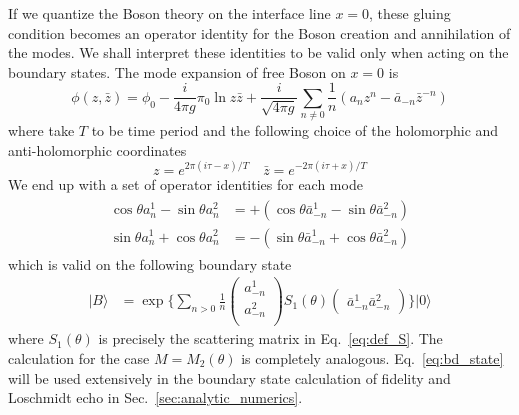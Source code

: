 If we quantize the Boson theory on the interface line $x = 0$, these gluing condition becomes an operator identity for the Boson creation and annihilation of the modes. We shall interpret these identities to be valid only when acting on the boundary states. The mode expansion of free Boson on $x = 0$\cite{di_francesco_conformal_1997} is
\begin{equation}
\phi(z, \bar{z} ) = \phi_0 - \frac{i}{4\pi g } \pi_0 \ln z \bar{z}  + \frac{i}{\sqrt{4\pi g} } \sum_{n \ne 0 } \frac{1}{n} \left(a_n z^n - \bar{a}_{-n } \bar{z}^{-n}   \right)
\end{equation}
where take $T$ to be time period and the following choice of the holomorphic and anti-holomorphic coordinates
\begin{equation}
z= e^{ 2\pi ( i\tau - x ) / T } \quad \bar{z} = e^{ -2\pi ( i\tau + x ) / T }
\end{equation}
We end up with a set of operator identities for each mode
\begin{eqnarray}\begin{aligned}
\label{eq:rotation_a_basis}
\cos\theta a_n^1-\sin\theta a_n^2 &= +( \cos\theta\bar{a}_{-n}^1-\sin\theta \bar{a}_{-n}^2 ) \\
\sin\theta a_n^1+\cos\theta a_n^2 &= -( \sin\theta\bar{a}_{-n}^1+\cos\theta \bar{a}_{-n}^2 ) 
\end{aligned}\end{eqnarray}
which is valid on the following boundary state
\begin{equation}
\label{eq:bd_state}
\begin{aligned}
| B \rangle 
& =  \exp\Big\{ \sum_{n > 0 } \frac{1}{n}
\begin{pmatrix}
a_{-n}^1\\
a_{-n}^2\\                              
\end{pmatrix}
S_1( \theta )
\begin{pmatrix}
\bar{a}_{-n}^1  \bar{a}_{-n}^2
\end{pmatrix} \Big\} |0\rangle
\end{aligned}
\end{equation}
where $S_1(\theta) $ is precisely the scattering matrix in Eq.~\eqref{eq:def_S}. The calculation for the case $M=M_2(\theta)$ is completely analogous. Eq.~\eqref{eq:bd_state} will be used extensively in the boundary state calculation of fidelity and Loschmidt echo in Sec.~\ref{sec:analytic_numerics}. 


